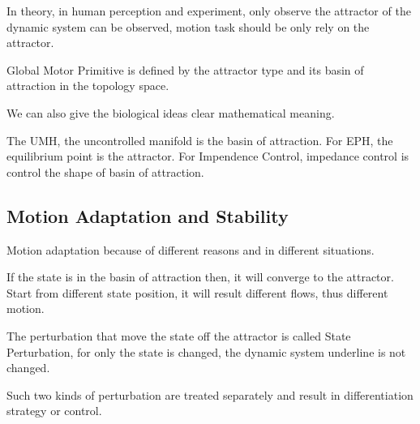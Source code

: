 In theory, in human perception and experiment, only observe the attractor of the dynamic system can be observed, motion task should be only rely on the attractor.

Global Motor Primitive is defined by the attractor type and its basin of attraction in the topology space.

We can also give the biological ideas clear mathematical meaning.

The UMH, the uncontrolled manifold is the basin of attraction.
For EPH, the equilibrium point is the attractor.
For Impendence Control, impedance control is control the shape of basin of attraction.




\subsection{Motion Adaptation and Stability}
Motion adaptation because of different reasons and in different situations.

If the state is in the basin of attraction then, it will converge to the attractor. 
Start from different state position, it will result different flows, thus different motion.

The perturbation that move the state off the attractor is called State Perturbation, for only the state is changed, the dynamic system underline is not changed.

Such two kinds of perturbation are treated separately and result in differentiation strategy or control.

